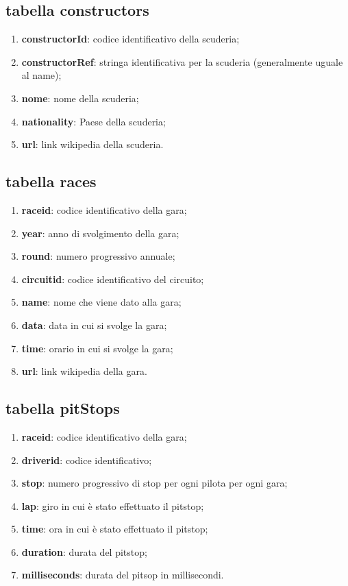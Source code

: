 \subsection{tabella constructors}%
\begin{enumerate}
    \item \textbf{constructorId}: codice identificativo della scuderia;
    \item \textbf{constructorRef}: stringa identificativa per la scuderia (generalmente uguale al name);
    \item \textbf{nome}: nome della scuderia;
    \item \textbf{nationality}: Paese della scuderia;
    \item \textbf{url}: link wikipedia della scuderia.
\end{enumerate}
\subsection{tabella races}%
\begin{enumerate}
    \item \textbf{raceid}: codice identificativo della gara;
    \item \textbf{year}: anno di svolgimento della gara;
    \item \textbf{round}: numero progressivo annuale;
    \item \textbf{circuitid}: codice identificativo del circuito;
    \item \textbf{name}: nome che viene dato alla gara;
    \item \textbf{data}: data in cui si svolge la gara;
    \item \textbf{time}: orario in cui si svolge la gara;
    \item \textbf{url}: link wikipedia della gara.
\end{enumerate}
\subsection{tabella pitStops}%
\begin{enumerate}
    \item \textbf{raceid}: codice identificativo della gara;
    \item \textbf{driverid}: codice identificativo;
    \item \textbf{stop}: numero progressivo di stop per ogni pilota per ogni gara;
    \item \textbf{lap}: giro in cui è stato effettuato il pitstop;
    \item \textbf{time}: ora in cui è stato effettuato il pitstop;
    \item \textbf{duration}: durata del pitstop;
    \item \textbf{milliseconds}: durata del pitsop in millisecondi.
\end{enumerate}
